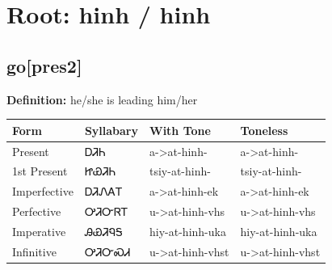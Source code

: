 \documentclass{article}%
\begin{document}
%
\normalsize%
\section*{Root: hinh / hinh}%
\subsection*{go[pres2]}%
\textbf{Definition: }%
he/she is leading him/her%
\\[0.5em]%
\begin{tabular}{|l|l|l|l|}%
\hline%
\textbf{Form}&\textbf{Syllabary}&\textbf{With Tone}&\textbf{Toneless}\\%
\hline%
Present&ᎠᏘᏂ&a{-}>at{-}hinh{-}&a{-}>at{-}hinh{-}\\%
1st Present&ᏥᏯᏘᏂ&tsiy{-}at{-}hinh{-}&tsiy{-}at{-}hinh{-}\\%
Imperfective&ᎠᏘᏁᎪᎢ&a{-}>at{-}hinh{-}ek&a{-}>at{-}hinh{-}ek\\%
Perfective&ᎤᏘᏅᏒᎢ&u{-}>at{-}hinh{-}vhs&u{-}>at{-}hinh{-}vhs\\%
Imperative&ᎯᏯᏘᏄᎦ&hiy{-}at{-}hinh{-}uka&hiy{-}at{-}hinh{-}uka\\%
Infinitive&ᎤᏘᏅᏍᏗ&u{-}>at{-}hinh{-}vhst&u{-}>at{-}hinh{-}vhst\\%
\hline%
\end{tabular}%
\\[1em]%
\end{document}
